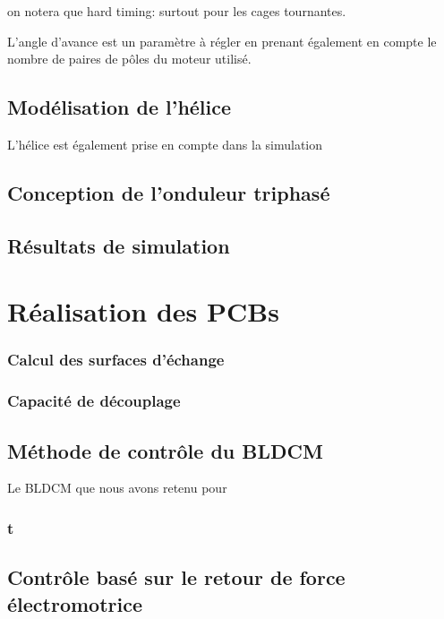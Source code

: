 on notera que hard timing: surtout pour les cages tournantes.

					L'angle d'avance est un paramètre à régler en prenant également en compte le nombre de paires de pôles du moteur utilisé.
		
			
			
				\subsection{Modélisation de l'hélice}
				
				L'hélice est également prise en compte dans la simulation 
				
				
				 
		\subsection{Conception de l'onduleur triphasé}
		
		\subsection{Résultats de simulation}
		
		
	\section{Réalisation des PCBs}
		
			\subsubsection{Calcul des surfaces d'échange}			
			
			\subsubsection{Capacité de découplage}
				 
				 \subsection{Méthode de contrôle du BLDCM}
				 
				 Le BLDCM que nous avons retenu pour 
				 
				 	\subsubsection{t}
				 
				 
				 
				 
				 
				 
				 
				 
				 

			
			\subsection{Contrôle basé sur le retour de force électromotrice}
			\newcommand{\pic}{\texttt{PIC16F1619} }
			\newcommand{\dspic}{\texttt{dsPIC30F2010} }